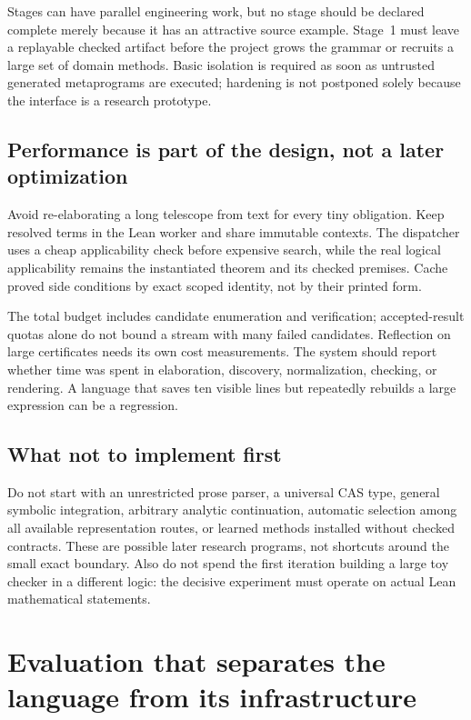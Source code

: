 \documentclass[11pt,letterpaper]{article}
\numberwithin{equation}{section}
\begin{document}
Stages can have parallel engineering work, but no stage should be declared
complete merely because it has an attractive source example. Stage~1 must leave
a replayable checked artifact before the project grows the grammar or recruits
a large set of domain methods. Basic isolation is required as soon as untrusted
generated metaprograms are executed; hardening is not postponed solely because
the interface is a research prototype.

\subsection{Performance is part of the design, not a later optimization}
Avoid re-elaborating a long telescope from text for every tiny obligation. Keep
resolved terms in the Lean worker and share immutable contexts. The dispatcher
uses a cheap applicability check before expensive search, while the real
logical applicability remains the instantiated theorem and its checked premises.
Cache proved side conditions by exact scoped identity, not by their printed form.

The total budget includes candidate enumeration and verification; accepted-result
quotas alone do not bound a stream with many failed candidates. Reflection on
large certificates needs its own cost measurements. The system should report
whether time was spent in elaboration, discovery, normalization, checking, or
rendering. A language that saves ten visible lines but repeatedly rebuilds a
large expression can be a regression.

\subsection{What not to implement first}
Do not start with an unrestricted prose parser, a universal CAS type, general
symbolic integration, arbitrary analytic continuation, automatic selection among
all available representation routes, or learned methods installed without checked
contracts. These are possible later research programs, not shortcuts around the
small exact boundary. Also do not spend the first iteration building a large toy
checker in a different logic: the decisive experiment must operate on actual
Lean mathematical statements.

\section{Evaluation that separates the language from its infrastructure}\label{sec:evaluation}
\end{document}
